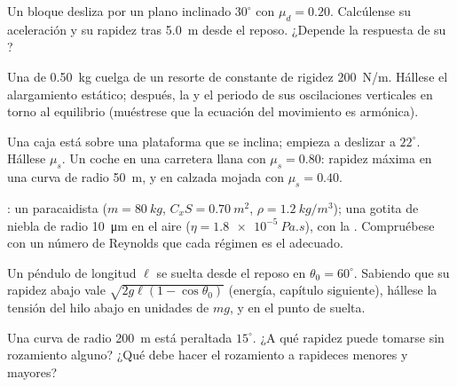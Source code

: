 \begin{exercise}[$\star$]\label{exo:b1:newton-dynamics:3}
Un bloque desliza por un plano inclinado $30^\circ$ con $\mu_d = 0.20$.
Calcúlense su aceleración y su rapidez tras \qty{5.0}{m} desde el reposo.
¿Depende la respuesta de su ?
\end{exercise}

\begin{exercise}[$\star$]\label{exo:b1:newton-dynamics:4}
Una  de \qty{0.50}{kg} cuelga de un resorte de constante de rigidez
\qty{200}{N/m}. Hállese el alargamiento estático; después, la  y el periodo de sus oscilaciones verticales en torno al equilibrio
(muéstrese que la ecuación del movimiento es armónica).
\end{exercise}

\begin{exercise}[$\star\star$]\label{exo:b1:newton-dynamics:5}
Una caja está sobre una plataforma que se inclina; empieza a deslizar a
$22^\circ$. Hállese $\mu_s$. Un coche en una carretera llana con
$\mu_s = 0.80$: rapidez máxima en una curva de radio \qty{50}{m}, y en
calzada mojada con $\mu_s = 0.40$.
\end{exercise}

\begin{exercise}[$\star\star$]\label{exo:b1:newton-dynamics:6}
: un paracaidista ($m = \qty{80}{kg}$, $C_xS = \qty{0.70}{m^2}$,
$\rho = \qty{1.2}{kg/m^3}$); una gotita de niebla de radio
\qty{10}{\micro m} en el aire ($\eta = \qty{1.8e-5}{Pa.s}$), con la . Compruébese con un número de Reynolds que cada régimen es el
adecuado.
\end{exercise}

\begin{exercise}[$\star\star$]\label{exo:b1:newton-dynamics:7}
Un péndulo de longitud $\ell$ se suelta desde el reposo en
$\theta_0 = 60^\circ$. Sabiendo que su rapidez abajo vale
$\sqrt{2g\ell(1 - \cos\theta_0)}$ (energía, capítulo siguiente), hállese
la tensión del hilo abajo en unidades de $mg$, y en el punto de suelta.
\end{exercise}

\begin{exercise}[$\star\star$]\label{exo:b1:newton-dynamics:8}
Una curva de radio \qty{200}{m} está peraltada $15^\circ$. ¿A qué rapidez
puede tomarse sin rozamiento alguno? ¿Qué debe hacer el rozamiento a
rapideces menores y mayores?
\end{exercise}

